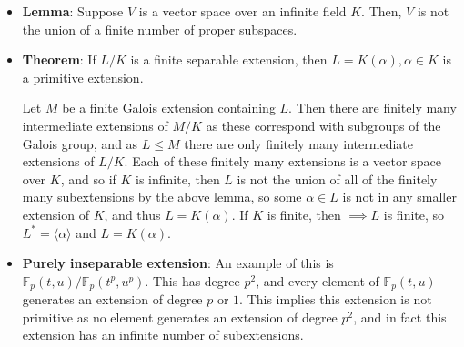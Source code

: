 \documentclass[11pt, oneside]{amsart}   	%
\theoremstyle{definition}
\begin{document}
\begin{itemize}
\begin{proof}
		Let $L$ be a finite extension of $\mathbb C$-- we will show that $L = \mathbb C$. Since $char(\mathbb C) = 0$, $L / \mathbb C$ is separable, 
		and we can assume that $L / \mathbb R$ is Galois (just make it normal by making it a splitting field), so set $G = Gal(L / \mathbb R)$. By fact 
		$ii$, $\mathbb R$ has no algebraic extensions of odd degree, for we there are no irreducible polynomials of odd degree (can just strip off the real 
		root), which implies that $G$ has no subgroups of odd index $> 1$. Let $H = Gal(L / \mathbb C)$, so $(G : H) = 2$. But $\mathbb C$ has no 
		quadratic extensions by $iii$, so $H$ has no subgroups of index 2. Let $S$ be a 2-Sylow of $G$ (the order of $G$ is its index with $1$ and hence 
		is even). Then $S$ has odd index ($|S| = p^\alpha$ with $p$ not dividing $|G| / p^\alpha$), so $S = G$ as $G$ has no subgroups of odd index 
		other than $G$ itself. Thus, $G = S$ has order $2^n$ for some $n\implies |H| = 2^{n - 1}$. If $n - 1 > 0$, then $H$ would have a subgroup of 
		index 2, which we have shown is not possible, so $n - 1 = 0\implies n = 1\implies |G| = 2\implies\mathbb C$ is algebraically closed.
	
	\end{proof}
	
	\item \textbf{Lemma}: Suppose $V$ is a vector space over an infinite field $K$. Then, $V$ is not the union of a finite number of proper subspaces.
	
	\item \textbf{Theorem}: If $L / K$ is a finite separable extension, then $L = K(\alpha), \alpha\in K$ is a primitive extension.
	
	Let $M$ be a finite Galois extension containing $L$. Then there are finitely many intermediate extensions of $M / K$ as these correspond with 
	subgroups of the Galois group, and as $L\leq M$ there are only finitely many intermediate extensions of $L / K$. Each of these finitely many 
	extensions is a vector space over $K$, and so if $K$ is infinite, then $L$ is not the union of all of the finitely many subextensions by the above 
	lemma, so some $\alpha\in L$ is not in any smaller extension of $K$, and thus $L = K(\alpha)$. If $K$ is finite, then $\implies L$ is finite, so 
	$L^* = \langle\alpha\rangle$ and $L = K(\alpha)$. 
	
	\item \textbf{Purely inseparable extension}: An example of this is $\mathbb F_p(t, u) / \mathbb F_p(t^p, u^p)$. This has degree $p^2$, and every 
	element of $\mathbb F_p(t, u)$ generates an extension of degree $p$ or $1$. This implies this extension is not primitive as no element generates 
	an extension of degree $p^2$, and in fact this extension has an infinite number of subextensions.
	

\end{itemize}
\end{document}
